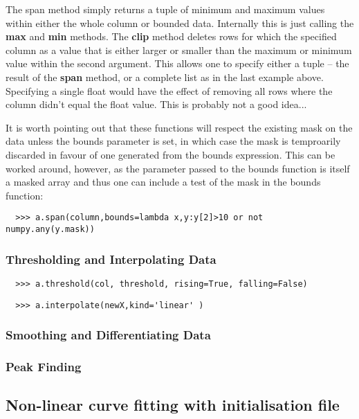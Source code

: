 \documentclass[a4paper,11pt]{scrartcl}
\begin{document}
The span method simply returns a tuple of minimum and maximum values within either the whole column or bounded data. Internally this is just calling the \textbf{max} and \textbf{min} methods. The \textbf{clip} method deletes rows for which the specified column as a value that is either larger or smaller than the maximum or minimum value within the second argument. This allows one to specify either a tuple -- \eg the result of the \textbf{span} method, or a complete list as in the last example above. Specifying a single float would have the effect of removing all rows where the column didn't equal the float value. This is probably not a good idea...

It is worth pointing out that these functions will respect the existing mask on the data unless the bounds parameter is set, in which case the mask is temproarily discarded in favour of one generated from the bounds expression. This can be worked around, however, as the parameter passed to the bounds function is itself a masked array and thus one can include a test of the mask in the bounds function:

\begin{verbatim}
  >>> a.span(column,bounds=lambda x,y:y[2]>10 or not numpy.any(y.mask))
\end{verbatim}

\subsubsection{Thresholding and Interpolating Data}
\begin{verbatim}
  >>> a.threshold(col, threshold, rising=True, falling=False)
\end{verbatim}

\begin{verbatim}
  >>> a.interpolate(newX,kind='linear' )
\end{verbatim}

\subsubsection{Smoothing and Differentiating Data}

\subsubsection{Peak Finding}

\subsection{Non-linear curve fitting with initialisation file}
\end{document}
